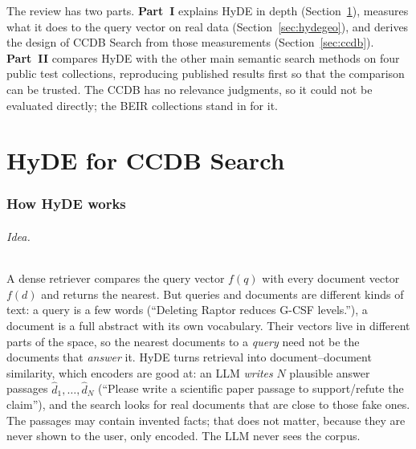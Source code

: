 \documentclass[11pt]{article}
\begin{document}
The review has two parts. \textbf{Part~I} explains HyDE in depth (Section~\ref{sec:hydehow}),
measures what it does to the query vector on real data (Section~\ref{sec:hydegeo}), and derives the
design of CCDB Search from those measurements (Section~\ref{sec:ccdb}). \textbf{Part~II} compares HyDE
with the other main semantic search methods on four public test collections, reproducing published
results first so that the comparison can be trusted. The CCDB has no relevance judgments, so it could
not be evaluated directly; the BEIR collections stand in for it.

\part{HyDE for CCDB Search}

\section{How HyDE works}\label{sec:hydehow}
\paragraph{Idea.} A dense retriever compares the query vector $f(q)$ with every document vector
$f(d)$ and returns the nearest. But queries and documents are different kinds of text: a query is a
few words (``Deleting Raptor reduces G-CSF levels.''), a document is a full abstract with its own
vocabulary. Their vectors live in different parts of the space, so the nearest documents to a
\emph{query} need not be the documents that \emph{answer} it. HyDE turns retrieval into
document--document similarity, which encoders are good at: an LLM \emph{writes} $N$ plausible answer
passages $\hat d_1,\dots,\hat d_N$ (``Please write a scientific paper passage to support/refute the
claim''), and the search looks for real documents that are close to those fake ones. The passages
may contain invented facts; that does not matter, because they are never shown to the user, only
encoded. The LLM never sees the corpus.

\begin{center}\end{center}
\end{document}
